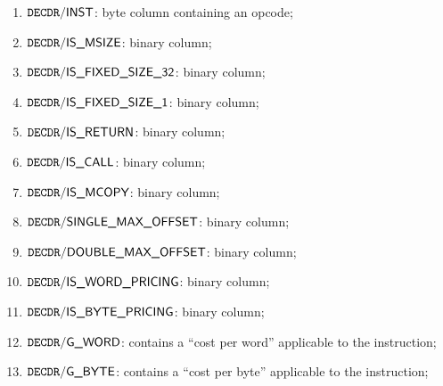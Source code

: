 \begin{enumerate}
	\item $\texttt{DECDR}\textsf{/}{\textsf{INST}}$:
		byte column containing an opcode;
	\item $\texttt{DECDR}\textsf{/}{\textsf{IS\_MSIZE}}$:
		binary column;
	\item $\texttt{DECDR}\textsf{/}{\textsf{IS\_FIXED\_SIZE\_32}}$:
		binary column;
	\item $\texttt{DECDR}\textsf{/}{\textsf{IS\_FIXED\_SIZE\_1}}$:
		binary column;
	\item $\texttt{DECDR}\textsf{/}{\textsf{IS\_RETURN}}$:
		binary column;
	\item $\texttt{DECDR}\textsf{/}{\textsf{IS\_CALL}}$:
		binary column;
	\item $\texttt{DECDR}\textsf{/}{\textsf{IS\_MCOPY}}$:
		binary column;
	\item $\texttt{DECDR}\textsf{/}{\textsf{SINGLE\_MAX\_OFFSET}}$:
		binary column;
	\item $\texttt{DECDR}\textsf{/}{\textsf{DOUBLE\_MAX\_OFFSET}}$:
		binary column;
	\item $\texttt{DECDR}\textsf{/}{\textsf{IS\_WORD\_PRICING}}$:
		binary column;
	\item $\texttt{DECDR}\textsf{/}{\textsf{IS\_BYTE\_PRICING}}$:
		binary column;
	\item $\texttt{DECDR}\textsf{/}{\textsf{G\_WORD}}$:
		contains a ``cost per \evm{} word'' applicable to the instruction;
	\item $\texttt{DECDR}\textsf{/}{\textsf{G\_BYTE}}$:
		contains a ``cost per \evm{} byte'' applicable to the instruction;
\end{enumerate}
